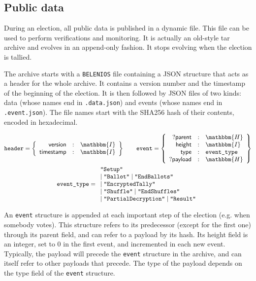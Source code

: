 \documentclass[a4paper]{article}
\newcommand{\hash}{\mathbbm{H}}
\newcommand{\I}{\mathbbm{I}}
\begin{document}
\subsection{Public data}
\label{public-data}

During an election, all public data is published in a dynamic
file. This file can be used to perform verifications and
monitoring. It is actually an old-style tar archive and evolves in an
append-only fashion. It stops evolving when the election is tallied.

The archive starts with a \texttt{BELENIOS} file containing a JSON
structure that acts as a header for the whole archive. It contains a
version number and the timestamp of the beginning of the election.  It
is then followed by JSON files of two kinds: data (whose names end in
\texttt{.data.json}) and events (whose names end in
\texttt{.event.json}). The file names start with the SHA256 hash of
their contents, encoded in hexadecimal.

\begin{gather*}
  \texttt{header}=\left\{
    \begin{array}{rcl}
      \textsf{version}&:&\I\\
      \textsf{timestamp}&:&\I
    \end{array}
  \right\}
  \qquad
  \texttt{event}=\left\{
    \begin{array}{rcl}
      ?\textsf{parent}&:&\hash\\
      \textsf{height}&:&\I\\
      \textsf{type}&:&\texttt{event\_type}\\
      ?\textsf{payload}&:&\hash
    \end{array}
  \right\}\\
  \texttt{event\_type}=
  \begin{array}{l}
    \texttt{"Setup"}\\
    \mid\texttt{"Ballot"}
    \mid\texttt{"EndBallots"}\\
    \mid\texttt{"EncryptedTally"}\\
    \mid\texttt{"Shuffle"}
    \mid\texttt{"EndShuffles"}\\
    \mid\texttt{"PartialDecryption"}
    \mid\texttt{"Result"}
  \end{array}
\end{gather*}

An \texttt{event} structure is appended at each important step of the
election (e.g. when somebody votes). This structure refers to its
predecessor (except for the first one) through its \textsf{parent}
field, and can refer to a payload by its hash. Its \textsf{height}
field is an integer, set to 0 in the first event, and incremented in
each new event. Typically, the payload will precede the \texttt{event}
structure in the archive, and can itself refer to other payloads that
precede. The type of the payload depends on the \textsf{type} field of
the \texttt{event} structure.
\end{document}
